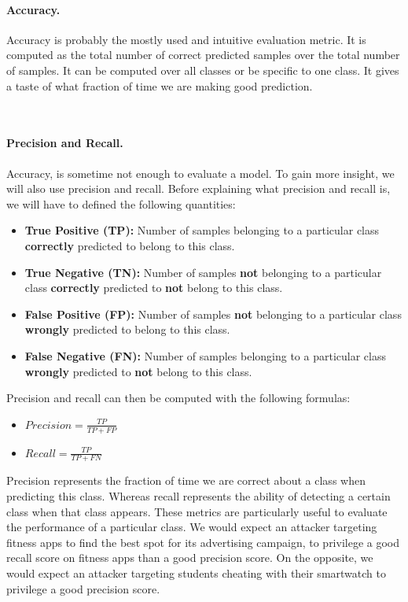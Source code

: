 \paragraph{Accuracy.} Accuracy is probably the mostly used and intuitive evaluation metric. It is computed as the total number of correct predicted samples over the total number of samples. It can be computed over all classes or be specific to one class. It gives a taste of what fraction of time we are making good prediction.

\\



 \paragraph{Precision and Recall.} 

Accuracy, is sometime not enough to evaluate a model. To gain more insight, we will also use precision and recall. Before explaining what precision and recall is, we will have to defined the following quantities:

\begin{itemize}
    \item \textbf{True Positive (TP):} Number of samples belonging to a particular class \textbf{correctly} predicted to belong to this class.
    
    \item \textbf{True Negative (TN):} Number of samples \textbf{not} belonging to a particular class \textbf{correctly} predicted to \textbf{not} belong to this class.

    \item \textbf{False Positive (FP):} Number of samples \textbf{not} belonging to a particular class \textbf{wrongly} predicted to belong to this class.

    \item \textbf{False Negative (FN):} Number of samples belonging to a particular class \textbf{wrongly} predicted to \textbf{not} belong to this class.
\end{itemize}

Precision and recall can then be computed with the following formulas:
\begin{itemize}
    \item $Precision=\frac{TP}{TP + FP}$
    \item $Recall = \frac{TP}{TP + FN}$
\end{itemize}

Precision represents the fraction of time we are correct about a class when predicting this class. Whereas recall represents the ability of detecting a certain class when that class appears. These metrics are particularly useful to evaluate the performance of a particular class. We would expect an attacker targeting fitness apps to find the best spot for its advertising campaign, to privilege a good recall score on fitness apps than a good precision score. On the opposite, we would expect an attacker targeting students cheating with their smartwatch to privilege a good precision score. 




